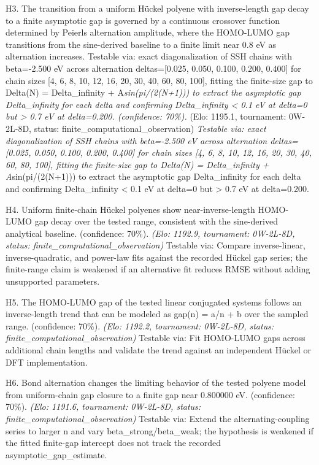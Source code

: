 \documentclass[11pt,a4paper]{article}
\begin{document}
H3. The transition from a uniform Hückel polyene with inverse-length gap decay to a finite asymptotic gap is governed by a continuous crossover function determined by Peierls alternation amplitude, where the HOMO-LUMO gap transitions from the sine-derived baseline to a finite limit near 0.8 eV as alternation increases. Testable via: exact diagonalization of SSH chains with beta=-2.500 eV across alternation deltas=[0.025, 0.050, 0.100, 0.200, 0.400] for chain sizes [4, 6, 8, 10, 12, 16, 20, 30, 40, 60, 80, 100], fitting the finite-size gap to Delta(N) = Delta\_infinity + A\textit{sin(pi/(2(N+1))) to extract the asymptotic gap Delta\_infinity for each delta and confirming Delta\_infinity < 0.1 eV at delta=0 but > 0.7 eV at delta=0.200. (confidence: 70\%). }(Elo: 1195.1, tournament: 0W-2L-8D, status: finite\_computational\_observation)\textit{ Testable via: exact diagonalization of SSH chains with beta=-2.500 eV across alternation deltas=[0.025, 0.050, 0.100, 0.200, 0.400] for chain sizes [4, 6, 8, 10, 12, 16, 20, 30, 40, 60, 80, 100], fitting the finite-size gap to Delta(N) = Delta\_infinity + A}sin(pi/(2(N+1))) to extract the asymptotic gap Delta\_infinity for each delta and confirming Delta\_infinity < 0.1 eV at delta=0 but > 0.7 eV at delta=0.200.

H4. Uniform finite-chain Hückel polyenes show near-inverse-length HOMO-LUMO gap decay over the tested range, consistent with the sine-derived analytical baseline. (confidence: 70\%). \textit{(Elo: 1192.9, tournament: 0W-2L-8D, status: finite\_computational\_observation)} Testable via: Compare inverse-linear, inverse-quadratic, and power-law fits against the recorded Hückel gap series; the finite-range claim is weakened if an alternative fit reduces RMSE without adding unsupported parameters.

H5. The HOMO-LUMO gap of the tested linear conjugated systems follows an inverse-length trend that can be modeled as gap(n) = a/n + b over the sampled range. (confidence: 70\%). \textit{(Elo: 1192.2, tournament: 0W-2L-8D, status: finite\_computational\_observation)} Testable via: Fit HOMO-LUMO gaps across additional chain lengths and validate the trend against an independent Hückel or DFT implementation.

H6. Bond alternation changes the limiting behavior of the tested polyene model from uniform-chain gap closure to a finite gap near 0.800000 eV. (confidence: 70\%). \textit{(Elo: 1191.6, tournament: 0W-2L-8D, status: finite\_computational\_observation)} Testable via: Extend the alternating-coupling series to larger n and vary beta\_strong/beta\_weak; the hypothesis is weakened if the fitted finite-gap intercept does not track the recorded asymptotic\_gap\_estimate.
\end{document}
